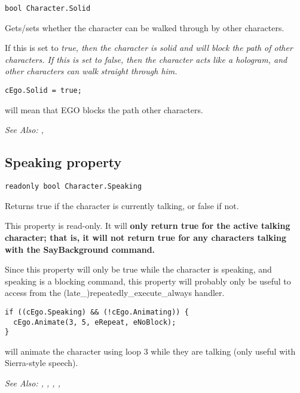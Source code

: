 \begin{verbatim}
bool Character.Solid
\end{verbatim}
Gets/sets whether the character can be walked through by other characters.

If this is set to \it{true}, then the character is solid and will block the path of other
characters. If this is set to \it{false}, then the character acts like a hologram, and other
characters can walk straight through him.

\begin{verbatim}
cEgo.Solid = true;
\end{verbatim}
will mean that EGO blocks the path other characters.

\it{See Also:} ,


\subsection{Speaking property}\label{Character.Speaking}%

\begin{verbatim}
readonly bool Character.Speaking
\end{verbatim}
Returns true if the character is currently talking, or false if not.

This property is read-only. It will \bf{only} return true for the active talking character;
that is, it will not return true for any characters talking with the SayBackground command.

Since this property will only be true while the character is speaking, and speaking is
a blocking command, this property will probably only be useful to access from
the (late_)repeatedly_execute_always handler.

\begin{verbatim}
if ((cEgo.Speaking) && (!cEgo.Animating)) {
  cEgo.Animate(3, 5, eRepeat, eNoBlock);
}
\end{verbatim}
will animate the character using loop 3 while they are talking (only useful with Sierra-style speech).

\it{See Also:} ,
,
,
,


